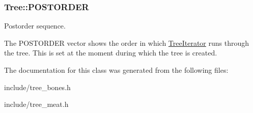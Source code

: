 \subsubsection[{\texorpdfstring{P\+O\+S\+T\+O\+R\+D\+ER}{POSTORDER}}]{ Tree\+::\+P\+O\+S\+T\+O\+R\+D\+ER\hspace{0.3cm}{\ttfamily [protected]}}\hypertarget{classTree_a310e76b803db38e7067514822b21a58f}{}\label{classTree_a310e76b803db38e7067514822b21a58f}


Postorder sequence. 

The P\+O\+S\+T\+O\+R\+D\+ER vector shows the order in which \hyperlink{classTreeIterator}{Tree\+Iterator} runs through the tree. This is set at the moment during which the tree is created. 

The documentation for this class was generated from the following files\+:\begin{DoxyCompactItemize}
\item 
include/tree\+\_\+bones.\+h\item 
include/tree\+\_\+meat.\+h\end{DoxyCompactItemize}
